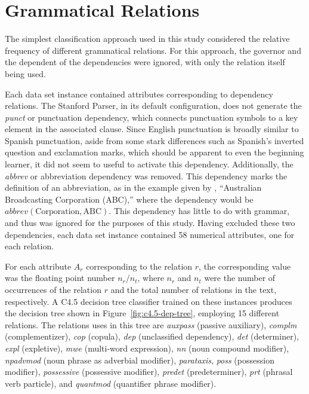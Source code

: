 \documentclass[main.tex]{subfiles}
\begin{document}
\section{Grammatical Relations}
\setcounter{section}{5}

The simplest classification approach used in this study considered the relative frequency of different grammatical relations. For this approach, the governor and the dependent of the dependencies were ignored, with only the relation itself being used. 

Each data set instance contained attributes corresponding to dependency relations. The Stanford Parser, in its default configuration, does not generate the \textit{punct} or punctuation dependency, which connects punctuation symbols to a key element in the associated clause. Since English punctuation is broadly similar to Spanish punctuation, aside from some stark differences such as Spanish's inverted question and exclamation marks, which should be apparent to even the beginning learner, it did not seem to useful to activate this dependency. Additionally, the \textit{abbrev} or abbreviation dependency was removed. This dependency marks the definition of an abbreviation, as in the example given by \citet{typed-deps-manual}, ``Australian Broadcasting Corporation (ABC),'' where the dependency would be $abbrev(\text{Corporation},\text{ABC})$. This dependency has little to do with grammar, and thus was ignored for the purposes of this study. Having excluded these two dependencies, each data set instance contained 58 numerical attributes, one for each relation.

      For each attribute $A_r$ corresponding to the relation $r$, the corresponding value was the floating point number $n_r/n_t$, where $n_r$ and $n_t$ were the number of occurrences of the relation $r$ and the total number of relations in the text, respectively. A C4.5 decision tree classifier trained on these instances produces the decision tree shown in Figure~\ref{fig:c4.5-dep-tree}, employing 15 different relations. The relations uses in this tree are \textit{auxpass} (passive auxiliary), \textit{complm} (complementizer), \textit{cop} (copula), \textit{dep} (unclassified dependency), \textit{det} (determiner), \textit{expl} (expletive), \textit{mwe} (multi-word expression), \textit{nn} (noun compound modifier), \textit{npadvmod} (noun phrase as adverbial modifier), \textit{parataxis}, \textit{poss} (possession modifier), \textit{possessive} (possessive modifier), \textit{predet} (predeterminer), \textit{prt} (phrasal verb particle), and \textit{quantmod} (quantifier phrase modifier).
\end{document}
